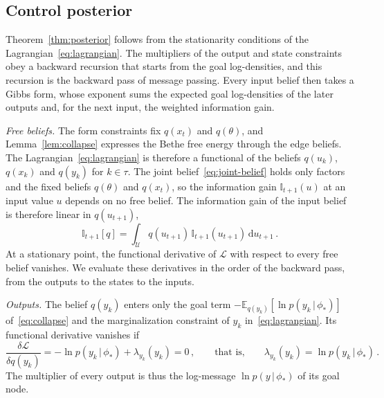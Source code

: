 \documentclass{l4dc2027}
\def\rmd{\mathrm{d}}
\def\cU{\mathcal{U}}
\newcommand\given[1][]{\,#1\vert\,}
\newcommand{\E}{\mathbb{E}}
\newenvironment{proofof}[1]{\par\noindent{\bfseries\upshape Proof of #1\ }}{\jmlrQED}
\begin{document}
\subsection{Control posterior}\label{supp:posterior}

Theorem~\ref{thm:posterior} follows from the stationarity conditions of the Lagrangian~\eqref{eq:lagrangian}. The multipliers of the output and state constraints obey a backward recursion that starts from the goal log-densities, and this recursion is the backward pass of message passing. Every input belief then takes a Gibbs form, whose exponent sums the expected goal log-densities of the later outputs and, for the next input, the weighted information gain.

\begin{proofof}{Theorem~\ref{thm:posterior}}
\emph{Free beliefs.} The form constraints fix $q(x_t)$ and $q(\theta)$, and Lemma~\ref{lem:collapse} expresses the Bethe free energy through the edge beliefs. The Lagrangian~\eqref{eq:lagrangian} is therefore a functional of the beliefs $q(u_k)$, $q(x_k)$ and $q(y_k)$ for $k \in \tau$. The joint belief~\eqref{eq:joint-belief} holds only factors and the fixed beliefs $q(\theta)$ and $q(x_t)$, so the information gain $\mathbb{I}_{t+1}(u)$ at an input value $u$ depends on no free belief. The information gain of the input belief is therefore linear in $q(u_{t+1})$,
\begin{equation}\label{eq:post-linear}
	\mathbb{I}_{t+1}[q] = \int_{\cU} q(u_{t+1})\, \mathbb{I}_{t+1}(u_{t+1})\, \rmd u_{t+1} \, .
\end{equation}
At a stationary point, the functional derivative of $\mathcal{L}$ with respect to every free belief vanishes. We evaluate these derivatives in the order of the backward pass, from the outputs to the states to the inputs.

\emph{Outputs.} The belief $q(y_k)$ enters only the goal term $-\E_{q(y_k)}[\ln p(y_k \given \phi_*)]$ of~\eqref{eq:collapse} and the marginalization constraint of $y_k$ in~\eqref{eq:lagrangian}. Its functional derivative vanishes if
\begin{equation}\label{eq:post-output}
	\frac{\delta \mathcal{L}}{\delta q(y_k)} = -\ln p(y_k \given \phi_*) + \lambda_{y_k}(y_k) = 0 \, , \qquad \text{that is,} \qquad \lambda_{y_k}(y_k) = \ln p(y_k \given \phi_*) \, .
\end{equation}
The multiplier of every output is thus the log-message $\ln p(y \given \phi_*)$ of its goal node.


\end{proofof}
\end{document}
